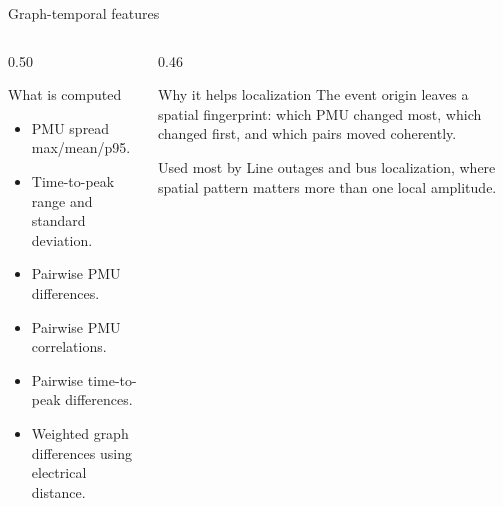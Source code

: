 \documentclass[10pt,aspectratio=169]{beamer}
\begin{document}
\begin{frame}{Graph-temporal features}
\small
\begin{columns}[T,totalwidth=\textwidth]
\begin{column}{0.50\textwidth}
\begin{block}{What is computed}
\begin{itemize}
  \item PMU spread max/mean/p95.
  \item Time-to-peak range and standard deviation.
  \item Pairwise PMU differences.
  \item Pairwise PMU correlations.
  \item Pairwise time-to-peak differences.
  \item Weighted graph differences using electrical distance.
\end{itemize}
\end{block}
\end{column}
\begin{column}{0.46\textwidth}
\begin{exampleblock}{Why it helps localization}
The event origin leaves a spatial fingerprint: which PMU changed most, which changed first, and which pairs moved coherently.
\end{exampleblock}
\begin{alertblock}{Used most by}
Line outages and bus localization, where spatial pattern matters more than one local amplitude.
\end{alertblock}
\end{column}
\end{columns}
\end{frame}
\end{document}
